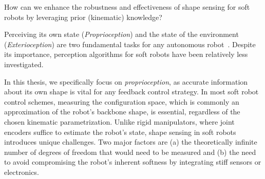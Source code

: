 \begin{researchquestion}\label{rq:shape_sensing}
    How can we enhance the robustness and effectiveness of shape sensing for soft robots by leveraging prior (kinematic) knowledge?
\end{researchquestion}
Perceiving its own state (\emph{Proprioception}) and the state of the environment (\emph{Exterioception}) are two fundamental tasks for any autonomous robot~\citep{thuruthel2019soft}.
Despite its importance, perception algorithms for soft robots have been relatively less investigated.

In this thesis, we specifically focus on \emph{proprioception}, as accurate information about its own shape is vital for any feedback control strategy. 
In most soft robot control schemes, measuring the configuration space, which is commonly an approximation of the robot’s backbone shape, is essential, regardless of the chosen kinematic parametrization. Unlike rigid manipulators, where joint encoders suffice to estimate the robot’s state, shape sensing in soft robots introduces unique challenges. Two major factors are (a) the theoretically infinite number of degrees of freedom that would need to be measured and (b) the need to avoid compromising the robot’s inherent softness by integrating stiff sensors or electronics.
